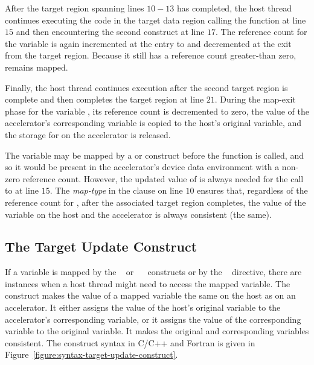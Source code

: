 After the target region spanning lines $10-13$ has completed, the host thread
continues executing the code in the target data region calling the function  at
line $15$ and then encountering the second  construct at line
$17$.  The reference count for the variable  is again incremented at the
entry to and decremented at the exit from the target region.  Because it still
has a reference count greater-than zero,  remains mapped.

Finally, the host thread continues execution after the second target region is
complete and then completes the target region at line $21$.  During the map-exit
phase for the variable , its reference count is decremented to zero, the
value of the accelerator's corresponding  variable is copied to the host's
original  variable, and the storage for  on the accelerator is released.

The variable  may be mapped by a  or  construct 
before the function  is called, and so it would be present in the accelerator's
device data environment with a non-zero reference count.
However, the updated value of  is always needed for the call to  at line $15$.
The  \emph{map-type} in the  clause on line $10$ ensures
that, regardless of the reference count for , after the associated target
region completes, the value of the variable  on the host and the accelerator
is always consistent (the same).  

\subsection{The Target Update Construct}
\label{ssec:06.target_update_construct}

If a variable is mapped by the ~ or
~~ constructs or by the
~ directive, there are instances when a host thread
might need to access the mapped variable.  The  construct
makes the value of a mapped variable the same on the host as on an
accelerator.  It either assigns the value of the host's original variable to
the accelerator's corresponding variable, or it assigns the
value of the corresponding variable to the original variable. It makes the
original and corresponding variables consistent.  The 
construct syntax in C/C++ and Fortran is given in
Figure~\ref{figure:syntax-target-update-construct}.


